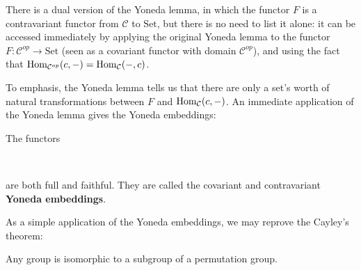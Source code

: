 	There is a dual version of the Yoneda lemma, in which the functor $F$ is a contravariant functor from $\mathcal{C}$ to $\mathrm{Set}$, but there is no need to list it alone: it can be accessed immediately by applying the original Yoneda lemma to the functor $F:\mathcal{C}^{op}\to \mathrm{Set}$ (seen as a covariant functor with domain $\mathcal{C}^{op}$), and using the fact that $\operatorname{Hom}_{\mathcal{C}^{op}}(c,-)=\operatorname{Hom}_\mathcal{C}(-,c)$. \par
	To emphasis, the Yoneda lemma tells us that there are only a set's worth of natural transformations between $F$ and $\operatorname{Hom}_\mathcal{C}(c,-)$. An immediate application of the Yoneda lemma gives the Yoneda embeddings:
	\begin{corollary}
		The functors
		\begin{center}
	\ \ \ \ \ \ \ \ \ 
	\end{center}
	are both full and faithful. They are called the covariant and contravariant \textbf{Yoneda embeddings}. 
	\end{corollary}
	As a simple application of the Yoneda embeddings, we may reprove the Cayley's theorem:
	\begin{corollary}
	 Any group is isomorphic to a subgroup of a permutation group.
	\end{corollary}
